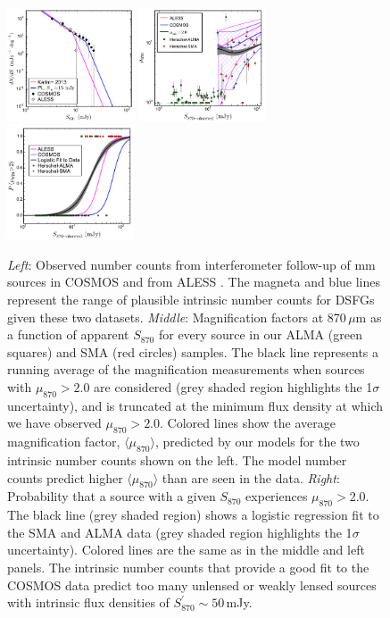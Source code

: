 \documentclass[iop]{emulateapj}
\begin{document}
\begin{figure}[!tbp] 
\includegraphics[width=0.335\textwidth]{DifferentialNumberCounts.pdf}
\includegraphics[width=0.335\textwidth]{s870_mu_z1p5.pdf}
\includegraphics[width=0.335\textwidth]{Pmu_S870_z1p5.pdf}

\caption{ {\it Left}: Observed number counts from interferometer
follow-up of mm sources in COSMOS \citep[black circles;][]{Younger:2007fk,
Younger:2009lr, Miettinen:2015lr} and from ALESS \citep[pink
diamonds;][]{Karim:2013lr}.  The magneta and blue lines represent the range of
plausible intrinsic number counts for DSFGs given these two datasets.
{\it Middle}: Magnification factors at 870$\,\mu$m as a function of apparent
$S_{870}$ for every source in our ALMA (green squares) and SMA (red circles)
samples.  The black line represents a running average of the magnification
measurements when sources with $\mu_{870} > 2.0$ are considered (grey shaded
region highlights the 1$\sigma$ uncertainty), and is truncated at the minimum
flux density at which we have observed $\mu_{870} > 2.0$.  Colored lines show
the average magnification factor, $\langle\mu_{870}\rangle$, predicted by our
models for the two intrinsic number counts shown on the left.  The model
number counts predict higher $\langle\mu_{870}\rangle$ than are seen in
the data.  {\it Right}: Probability that a source with a given $S_{870}$
experiences $\mu_{870} > 2.0$.  The black line (grey shaded region) shows a
logistic regression fit to the SMA and ALMA data (grey shaded region highlights
the 1$\sigma$ uncertainty).  Colored lines are the same as in the middle and
left panels.  The intrinsic number counts that provide a good fit to the
COSMOS data predict too many unlensed or weakly lensed sources with intrinsic
flux densities of $S_{870}^\prime \sim 50\,$mJy.} \label{fig:lensstats}

\end{figure}
\end{document}
